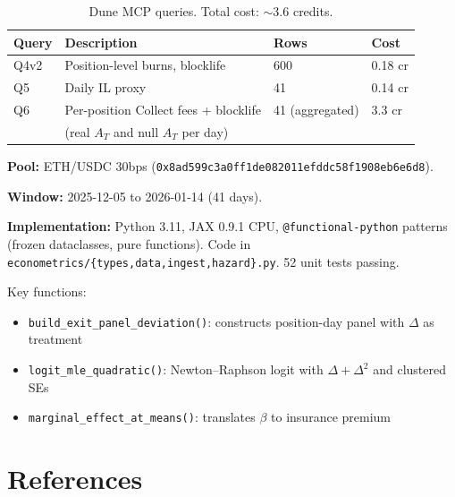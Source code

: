 \documentclass[11pt,a4paper]{article}
\begin{document}
\begin{table}[h]
\centering
\begin{tabular}{llll}
\toprule
Query & Description & Rows & Cost \\
\midrule
Q4v2 & Position-level burns, blocklife & 600 & 0.18 cr \\
Q5 & Daily IL proxy & 41 & 0.14 cr \\
Q6 & Per-position Collect fees + blocklife & 41 (aggregated) & 3.3 cr \\
 & (real $A_T$ and null $A_T$ per day) & & \\
\bottomrule
\end{tabular}
\caption{Dune MCP queries. Total cost: $\sim$3.6 credits.}
\end{table}

\textbf{Pool:} ETH/USDC 30bps
(\texttt{0x8ad599c3a0ff1de082011efddc58f1908eb6e6d8}).

\textbf{Window:} 2025-12-05 to 2026-01-14 (41 days).

\textbf{Implementation:} Python 3.11, JAX 0.9.1 CPU,
\texttt{@functional-python} patterns (frozen dataclasses, pure functions).
Code in \texttt{econometrics/\{types,data,ingest,hazard\}.py}. 52 unit
tests passing.

Key functions:
\begin{itemize}[nosep]
  \item \texttt{build\_exit\_panel\_deviation()}: constructs position-day
        panel with $\Delta$ as treatment
  \item \texttt{logit\_mle\_quadratic()}: Newton--Raphson logit with
        $\Delta + \Delta^2$ and clustered SEs
  \item \texttt{marginal\_effect\_at\_means()}: translates $\beta$ to
        insurance premium
\end{itemize}


\section{References}\label{sec:references}
\end{document}
